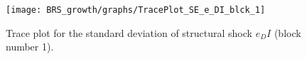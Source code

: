 \begin{figure}[H]
\centering
  \texttt{[image: BRS\_growth/graphs/TracePlot\_SE\_e\_DI\_blck\_1]}\\
    \caption{Trace plot for the standard deviation of structural shock ${e_DI}$ (block number 1).}
\end{figure}
